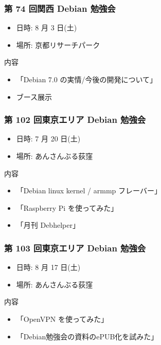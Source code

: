 \documentclass[cjk,dvipdfmx,10pt,compress,%
hyperref={bookmarks=true,bookmarksnumbered=true,bookmarksopen=false,%
colorlinks=false,%
pdftitle={第 75 回 関西 Debian 勉強会},%
pdfauthor={倉敷・のがた・佐々木・かわだ・八津尾},%
pdfsubject={資料},%
}]{beamer}
\begin{document}
\begin{frame}[fragile]
  \frametitle{第 74 回関西 Debian 勉強会}
  \begin{itemize}
  \item 日時: 8 月 3 日(土)
  \item 場所: 京都リサーチパーク
  \end{itemize}
  \begin{block}{内容}
    \begin{itemize}
    \item 「Debian 7.0 の実情/今後の開発について」
    \item ブース展示
    \end{itemize}
  \end{block}
\end{frame}

\begin{frame}[fragile]
  \frametitle{第 102 回東京エリア Debian 勉強会}
  \begin{itemize}
  \item 日時: 7 月 20 日(土)
  \item 場所: あんさんぶる荻窪
  \end{itemize}
  \begin{block}{内容}
    \begin{itemize}
    \item 「Debian linux kernel / armmp フレーバー」
    \item 「Raspberry Pi を使ってみた」
    \item 「月刊 Debhelper」
    \end{itemize}
  \end{block}
\end{frame}

\begin{frame}[fragile]
  \frametitle{第 103 回東京エリア Debian 勉強会}
  \begin{itemize}
  \item 日時: 8 月 17 日(土)
  \item 場所: あんさんぶる荻窪
  \end{itemize}
  \begin{block}{内容}
    \begin{itemize}
    \item 「OpenVPN を使ってみた」
    \item 「Debian勉強会の資料のePUB化を試みた」
    \end{itemize}
  \end{block}
\end{frame}
\end{document}
